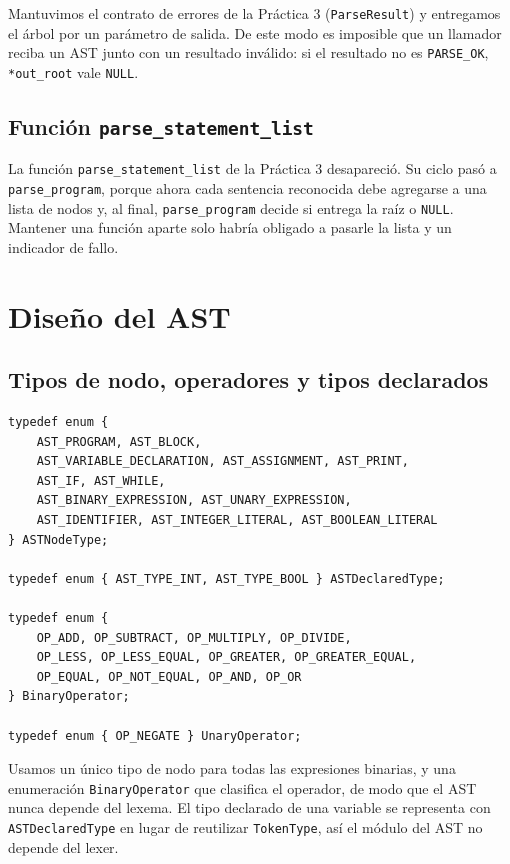\documentclass[12pt,letterpaper]{article}
\begin{document}
\bigskip

Mantuvimos el contrato de errores de la Práctica 3 (\texttt{ParseResult}) y entregamos el árbol por un
parámetro de salida. De este modo es imposible que un llamador reciba un AST junto con un resultado
inválido: si el resultado no es \texttt{PARSE\_OK}, \texttt{*out\_root} vale \texttt{NULL}.

\subsection*{Función \texttt{parse\_statement\_list}}

La función \texttt{parse\_statement\_list} de la Práctica 3 desapareció. Su ciclo pasó a
\texttt{parse\_program}, porque ahora cada sentencia reconocida debe agregarse a una lista de nodos y, al
final, \texttt{parse\_program} decide si entrega la raíz o \texttt{NULL}. Mantener una función aparte
solo habría obligado a pasarle la lista y un indicador de fallo.


\section*{Diseño del AST}

\subsection*{Tipos de nodo, operadores y tipos declarados}

\begin{lstlisting}[style=modernc, caption={Enumeraciones de \texttt{ast.h}.}]
typedef enum {
    AST_PROGRAM, AST_BLOCK,
    AST_VARIABLE_DECLARATION, AST_ASSIGNMENT, AST_PRINT,
    AST_IF, AST_WHILE,
    AST_BINARY_EXPRESSION, AST_UNARY_EXPRESSION,
    AST_IDENTIFIER, AST_INTEGER_LITERAL, AST_BOOLEAN_LITERAL
} ASTNodeType;

typedef enum { AST_TYPE_INT, AST_TYPE_BOOL } ASTDeclaredType;

typedef enum {
    OP_ADD, OP_SUBTRACT, OP_MULTIPLY, OP_DIVIDE,
    OP_LESS, OP_LESS_EQUAL, OP_GREATER, OP_GREATER_EQUAL,
    OP_EQUAL, OP_NOT_EQUAL, OP_AND, OP_OR
} BinaryOperator;

typedef enum { OP_NEGATE } UnaryOperator;
\end{lstlisting}

\bigskip

Usamos un único tipo de nodo para todas las expresiones binarias, y una enumeración
\texttt{BinaryOperator} que clasifica el operador, de modo que el AST nunca depende del lexema. El tipo
declarado de una variable se representa con \texttt{ASTDeclaredType} en lugar de reutilizar
\texttt{TokenType}, así el módulo del AST no depende del lexer.
\end{document}
